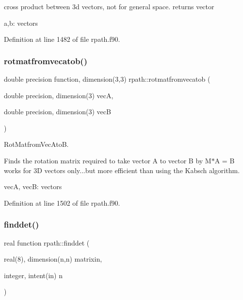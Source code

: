 cross product between 3d vectors, not for general space. returns vector


\begin{DoxyItemize}
\item a,b\+: vectors 
\end{DoxyItemize}

Definition at line 1482 of file rpath.\+f90.

\mbox{\label{namespacerpath_a12b369bd567aeaa3c22e2d2edccf1061}} 
\subsubsection{\texorpdfstring{rotmatfromvecatob()}{rotmatfromvecatob()}}
{\footnotesize\ttfamily double precision function, dimension(3,3) rpath\+::rotmatfromvecatob (\begin{DoxyParamCaption}\item[{double precision, dimension(3)}]{vecA,  }\item[{double precision, dimension(3)}]{vecB }\end{DoxyParamCaption})}



Rot\+Matfrom\+Vec\+AtoB. 

Finds the rotation matrix required to take vector A to vector B by M$\ast$A = B works for 3D vectors only...but more efficient than using the Kabsch algorithm.


\begin{DoxyItemize}
\item vecA, vecB\+: vectors 
\end{DoxyItemize}

Definition at line 1502 of file rpath.\+f90.

\mbox{\label{namespacerpath_a9e31b64b8c7ca2095afd9fc69f8e944b}} 
\subsubsection{\texorpdfstring{finddet()}{finddet()}}
{\footnotesize\ttfamily real function rpath\+::finddet (\begin{DoxyParamCaption}\item[{real(8), dimension(n,n)}]{matrixin,  }\item[{integer, intent(in)}]{n }\end{DoxyParamCaption})}



